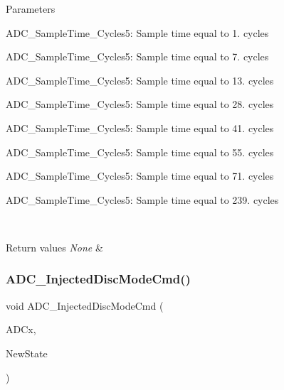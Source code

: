\begin{DoxyParams}{Parameters}
\begin{DoxyItemize}
\item A\+D\+C\+\_\+\+Sample\+Time\+\_\+Cycles5\+: Sample time equal to 1. cycles \item A\+D\+C\+\_\+\+Sample\+Time\+\_\+Cycles5\+: Sample time equal to 7. cycles \item A\+D\+C\+\_\+\+Sample\+Time\+\_\+Cycles5\+: Sample time equal to 13. cycles \item A\+D\+C\+\_\+\+Sample\+Time\+\_\+Cycles5\+: Sample time equal to 28. cycles \item A\+D\+C\+\_\+\+Sample\+Time\+\_\+Cycles5\+: Sample time equal to 41. cycles \item A\+D\+C\+\_\+\+Sample\+Time\+\_\+Cycles5\+: Sample time equal to 55. cycles \item A\+D\+C\+\_\+\+Sample\+Time\+\_\+Cycles5\+: Sample time equal to 71. cycles \item A\+D\+C\+\_\+\+Sample\+Time\+\_\+Cycles5\+: Sample time equal to 239. cycles\end{DoxyItemize}
\\
\hline
\end{DoxyParams}

\begin{DoxyRetVals}{Return values}
{\em None} & \\
\hline
\end{DoxyRetVals}
\mbox{\label{group___a_d_c___exported___functions_ga0b583b94183fa4ff287177b9ee808092}} 
\subsubsection{\texorpdfstring{ADC\_InjectedDiscModeCmd()}{ADC\_InjectedDiscModeCmd()}}
{\footnotesize\ttfamily void A\+D\+C\+\_\+\+Injected\+Disc\+Mode\+Cmd (\begin{DoxyParamCaption}\item[{\mbox{\hyperlink{struct_a_d_c___type_def}{A\+D\+C\+\_\+\+Type\+Def}} $\ast$}]{A\+D\+Cx,  }\item[{\mbox{\hyperlink{group___exported__types_gac9a7e9a35d2513ec15c3b537aaa4fba1}{Functional\+State}}}]{New\+State }\end{DoxyParamCaption})}



